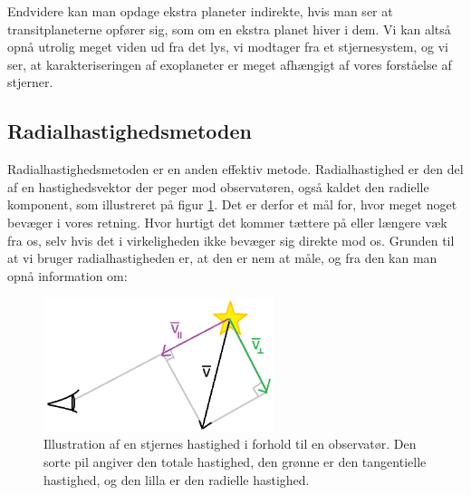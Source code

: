 Endvidere kan man opdage ekstra planeter indirekte, hvis man ser at transitplaneterne opfører sig, som om en ekstra planet hiver i dem. Vi kan altså opnå utrolig meget viden ud fra det lys, vi modtager fra et stjernesystem, og vi ser, at karakteriseringen af exoplaneter er meget afhængigt af vores forståelse af stjerner.

\subsection*{Radialhastighedsmetoden}
Radialhastighedsmetoden er en anden effektiv metode. Radialhastighed er den del af en hastighedsvektor der peger mod observatøren, også kaldet den radielle komponent, som illustreret på figur \ref{radvel}. Det er derfor et mål for, hvor meget noget bevæger i vores retning. Hvor hurtigt det kommer tættere på eller længere væk fra os, selv hvis det i virkeligheden ikke bevæger sig direkte mod os. Grunden til at vi bruger radialhastigheden er, at den er nem at måle, og fra den kan man opnå information om:

\begin{figure}[h!]
    \centering
    \includegraphics[width = 0.6\textwidth]{Astrofysik/billeder/radvel.png}  
    \caption{Illustration af en stjernes hastighed i forhold til en observatør. Den sorte pil angiver den totale hastighed, den grønne er den tangentielle hastighed, og den lilla er den radielle hastighed.}
    \label{radvel}
\end{figure}


